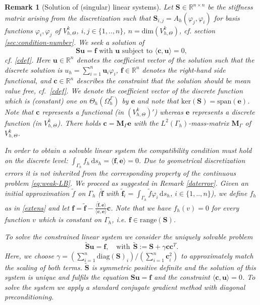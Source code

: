 \documentclass[final]{siamltex}
\newtheorem{remark}{Remark}
\begin{document}
\begin{remark}[Solution of (singular) linear systems] \label{sec:solvelinsys}\rm
Let ${\mathbf S} \in {\mathbb{R}}^{n \times n}$ be the stiffness matrix arising from the discretization such that 
${\mathbf S}_{i,j} = A_h(\varphi_j,\varphi_i)$ for basis functions $\varphi_i,\varphi_j$ of ${V_{h,\Theta}^k}$, $i,j \in \{1,..,n\}$, $n = \mathrm{dim}(V_{h,\Theta}^k)$, cf. section \ref{sec:condition-number}.
We seek a solution of 
\[
  {\mathbf S} {\mathbf{u}} = {\mathbf{f}} \text{ with } {\mathbf{u}} \text{ subject to } \langle {\mathbf{c}}, {\mathbf{u}} \rangle = 0,
\]
cf. \eqref{cdef}.
Here ${\mathbf{u}} \in {\mathbb{R}}^n$ denotes the coefficient vector of the solution such that the discrete solution is $u_h = \sum_{i=1}^n {\mathbf{u}}_i \varphi_i$, ${\mathbf{f}} \in {\mathbb{R}}^n$ denotes the right-hand side functional, and ${\mathbf{c}} \in {\mathbb{R}}^n$ describes the constraint that the solution should be mean value free, cf.~\eqref{cdef}.
We denote the coefficient vector of the discrete function which is (constant) one on $\Theta_h(\Omega_h^\Gamma)$ by ${\mathbf{e}}$ and note that $\mathrm{ker}({\mathbf S}) = \mathrm{span}({\mathbf{e}})$. 
Note that ${\mathbf{c}}$ represents a functional (in $(V_{h,\Theta}^k)'$) whereas ${\mathbf{e}}$ represents a discrete function (in $V_{h,\Theta}^k$). There holds ${\mathbf{c}} = {\mathbf{M}}_\Gamma {\mathbf{e}}$ with the $L^2(\Gamma_h)$-mass-matrix ${\mathbf{M}}_\Gamma$ of $V_{h,\Theta}^k$.

In order to obtain a solvable linear system the compatibility condition must hold on the discrete level: $\int_{\Gamma_h} f_h {\,\mathrm{d} {s_h}} = \langle {\mathbf{f}} , {\mathbf{e}} \rangle = 0$. Due to geometrical discretization errors it is not inherited from the corresponding property of the continuous problem \eqref{eq:weak-LB}. We proceed as suggested in Remark \ref{daterror}. Given an initial approximation $\tilde{f}$ on $\Gamma_h$ ($\tilde{\mathbf{f}}$ with $\tilde{\mathbf{f}}_i = \int_{\Gamma_h} \tilde{f} \varphi_i {\,\mathrm{d} {s_h}}$, $i\in\{1,..,n\}$), we define $f_h$ as in \eqref{extens} and let $ {\mathbf{f}} = \tilde{\mathbf{f}} - \frac{ \langle \tilde{\mathbf{f}}, {\mathbf{e}} \rangle }{ \langle {\mathbf{c}} , {\mathbf{e}} \rangle } {\mathbf{c}}$.
Note that we have $f_h(v) = 0$ for every function $v$ which is constant on $\Gamma_h$, i.e. 
${\mathbf{f}} \in \mathrm{range}({\mathbf S})$. 

To solve the constrained linear system we consider the uniquely solvable problem
\[
  \tilde {\mathbf S}  {\mathbf{u}} = {\mathbf{f}}, \quad \text{with} ~~ \tilde {\mathbf S} := {\mathbf S} + \gamma {\mathbf{c}}  {\mathbf{c}}^T.
\]
Here, we choose $\gamma = ( \sum_{i=1}^n \mathrm{diag}({\mathbf S})_i ) / ( \sum_{i=1}^n {\mathbf{c}}_i^2 )$ to approximately match the scaling of both terms. 
$\tilde{\mathbf S}$ is symmetric positive definite and the solution of this system is unique and fulfils the equation ${\mathbf S}  {\mathbf{u}} = {\mathbf{f}}$ and the constraint $ \langle {\mathbf{c}} , {\mathbf{u}} \rangle = 0$. To solve the system we apply a standard conjugate gradient method with diagonal preconditioning.
\end{remark}
\end{document}
